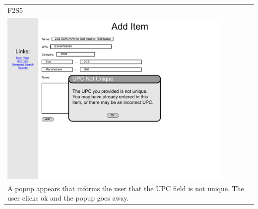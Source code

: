 \documentclass{article}
\begin{document}
~\\
~\\
\begin{tabular}{ p{4.5in} }
F2S5\\
\includegraphics[keepaspectratio, width=4.5in]{addItemF2S5.pdf} \\
A popup appears that informs the user that the UPC field is not unique. The user clicks ok and the popup goes away.
\end{tabular}
\end{document}

